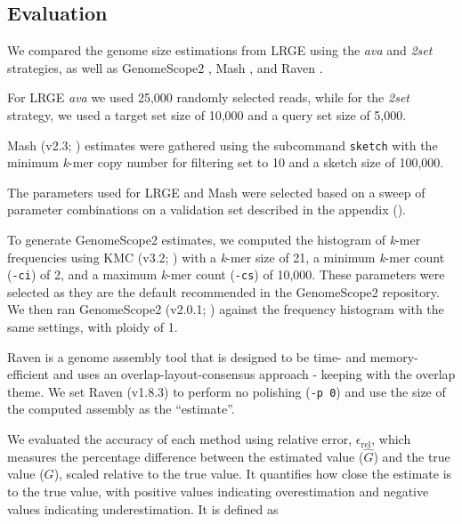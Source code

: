\documentclass[unnumsec,webpdf,modern,large]{oup-authoring-template}
\theoremstyle{thmstyleone}%
\theoremstyle{thmstyletwo}%
\theoremstyle{thmstylethree}%
\newcommand{\lrge}{LRGE}
\newcommand{\relerr}{$\epsilon_{\text{rel}}$}
\newcommand{\ava}{\textit{ava}}
\newcommand{\twoset}{\textit{2set}}
\newcommand{\kmer}{\textit{k}-mer}
\begin{document}


\subsection{Evaluation}
\label{sec:eval}

We compared the genome size estimations from \lrge{} using the \ava{} and \twoset{} strategies, 
as well as GenomeScope2 \citep{ranallo-benavidez_genomescope_2020}, Mash \citep{ondov_mash_2016}, and Raven \citep{vaser_time-_2021}.

For \lrge{} \ava{} we used 25,000 randomly selected reads, while for the \twoset{} strategy, 
we used a target set size of 10,000 and a query set size of 5,000.

Mash (v2.3; \citep{ondov_mash_2016}) estimates were gathered using the subcommand \texttt{sketch} with the minimum \kmer{} copy number for filtering set to 10 and a sketch size of 100,000.

The parameters used for \lrge{} and Mash were selected based on a sweep of parameter combinations on a validation set described in the appendix ().

To generate GenomeScope2 estimates, we computed the histogram of \kmer{} frequencies using 
KMC (v3.2; \citep{kokot_kmc_2017}) with a \kmer{} size of 21, a minimum \kmer{} count (\texttt{-ci}) of 2, and a maximum \kmer{} count (\texttt{-cs}) of 10,000. These parameters were selected as they are the default recommended in the GenomeScope2 repository. We then ran GenomeScope2 (v2.0.1; \citep{ranallo-benavidez_genomescope_2020}) against the frequency histogram with the same settings, with ploidy of 1.

Raven is a genome assembly tool that is designed to be time- and memory-efficient and uses an overlap-layout-consensus approach \citep{vaser_time-_2021} - keeping with the overlap theme. We set Raven (v1.8.3) to perform no polishing (\verb|-p 0|) and use the size of the computed assembly as the \enquote{estimate}.

We evaluated the accuracy of each method using relative error, \relerr{}, which measures the percentage difference between the estimated value ($\hat{G}$) and the true value ($G$), scaled relative to the true value. It quantifies how close the estimate is to the true value, with positive values indicating overestimation and negative values indicating underestimation. It is defined as
\end{document}
